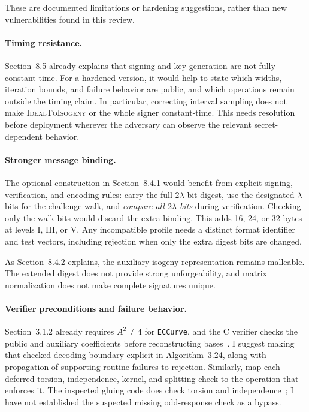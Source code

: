 \documentclass[a4paper,11pt]{article}
\newcommand{\algo}[1]{Algorithm~#1}
\newcommand{\code}[1]{\texttt{#1}}
\begin{document}
These are documented limitations or hardening suggestions, rather than new
vulnerabilities found in this review.

\paragraph{Timing resistance.}
Section~8.5 already explains that signing and key generation are not fully
constant-time. For a hardened version, it would help to state which widths,
iteration bounds, and failure behavior are public, and which operations
remain outside the timing claim. In particular, correcting interval
sampling does not make \textsc{IdealToIsogeny} or the whole signer
constant-time. This needs resolution before deployment wherever the
adversary can observe the relevant secret-dependent behavior.

\paragraph{Stronger message binding.}
The optional construction in Section~8.4.1 would benefit from explicit
signing, verification, and encoding rules: carry the full $2\lambda$-bit
digest, use the designated $\lambda$ bits for the challenge walk, and
\emph{compare all $2\lambda$ bits} during verification. Checking only the
walk bits would discard the extra binding. This adds 16, 24, or 32 bytes
at levels I, III, or V. Any incompatible profile needs a distinct format
identifier and test vectors, including rejection when only the extra
digest bits are changed.

As Section~8.4.2 explains, the auxiliary-isogeny representation remains
malleable. The extended digest does not provide strong unforgeability,
and matrix normalization does not make complete signatures unique.

\paragraph{Verifier preconditions and failure behavior.}
Section~3.1.2 already requires $A^2\ne4$ for \code{ECCurve}, and the C
verifier checks the public and auxiliary coefficients before reconstructing
bases~\cite{cref-verify}. I suggest making that checked decoding boundary
explicit in \algo{3.24}, along with propagation of supporting-routine
failures to rejection. Similarly, map each deferred torsion, independence,
kernel, and splitting check to the operation that enforces it. The inspected
gluing code does check torsion and independence~\cite{cref-gluing}; I have
not established the suspected missing odd-response check as a bypass.
\end{document}
